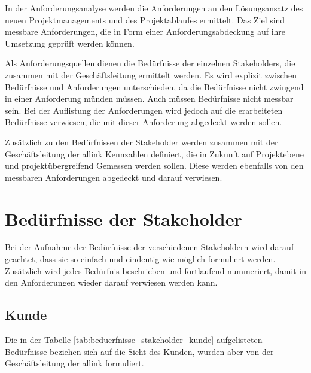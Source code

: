 In der Anforderungsanalyse werden die Anforderungen an den Lösungsansatz des
neuen Projektmanagements und des Projektablaufes ermittelt. Das Ziel sind messbare
Anforderungen, die in Form einer Anforderungsabdeckung auf ihre Umsetzung
geprüft werden können.

Als Anforderungsquellen dienen die Bedürfnisse der einzelnen Stakeholders, die 
zusammen mit der Geschäftsleitung ermittelt werden. Es wird explizit zwischen
Bedürfnisse und Anforderungen unterschieden, da die Bedürfnisse nicht zwingend
in einer Anforderung münden müssen. Auch müssen Bedürfnisse nicht messbar sein.
Bei der Auflistung der Anforderungen wird jedoch auf die erarbeiteten Bedürfnisse 
verwiesen, die mit dieser Anforderung abgedeckt werden sollen.

Zusätzlich zu den Bedürfnissen der Stakeholder werden zusammen mit der Geschäftsleitung
der allink Kennzahlen definiert, die in Zukunft auf Projektebene und projektübergreifend
Gemessen werden sollen. Diese werden ebenfalls von den messbaren Anforderungen
abgedeckt und darauf verwiesen.

\section{Bedürfnisse der Stakeholder}

Bei der Aufnahme der Bedürfnisse der verschiedenen Stakeholdern wird darauf geachtet, dass sie so einfach und 
eindeutig wie möglich formuliert werden. Zusätzlich wird jedes Bedürfnis beschrieben
und fortlaufend nummeriert, damit in den Anforderungen wieder darauf verwiesen
werden kann.

\subsection{Kunde}
Die in der Tabelle \ref{tab:beduerfnisse_stakeholder_kunde} aufgelisteten 
Bedürfnisse beziehen sich auf die Sicht des Kunden, wurden aber von der
Geschäftsleitung der allink formuliert.

